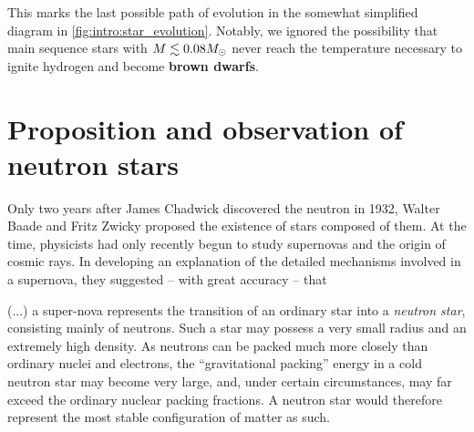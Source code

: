 This marks the last possible path of evolution in the somewhat simplified diagram in \cref{fig:intro:star_evolution}.
Notably, we ignored the possibility that main sequence stars with $M \lesssim 0.08 M_\odot$ never reach the temperature necessary to ignite hydrogen and become \textbf{brown dwarfs}.

\section{Proposition and observation of neutron stars}

Only two years after James Chadwick discovered the neutron in 1932, \cite{ref:neutron_discovery}
Walter Baade and Fritz Zwicky proposed the existence of stars composed of them.
At the time, physicists had only recently begun to study supernovas and the origin of cosmic rays.
In developing an explanation of the detailed mechanisms involved in a supernova, they suggested -- with great accuracy -- that
\cite[page 263]{ref:supernova_cosmic_rays_neutron_stars}
\begin{displayquote}
(...) %
a super-nova represents the transition of an ordinary star into a \emph{neutron star}, consisting mainly of neutrons.
Such a star may possess a very small radius and an extremely high density.
As neutrons can be packed much more closely than ordinary nuclei and electrons, the ``gravitational packing'' energy in a cold neutron star may become very large, and, under certain circumstances, may far exceed the ordinary nuclear packing fractions.
A neutron star would therefore represent the most stable configuration of matter as such.
\end{displayquote}

\iffalse
The first theoretical model of a neutron star was developed by Oppenheimer and Volkoff in 1939. \cite{ref:tov}
Assuming a neutron star consists entirely of a non-interacting cold Fermi gas, they found an equation of state governing its internals and solved the Einstein field equations in a radially symmetric perfect fluid to find the mass and radii of neutron stars.
In such a cold gas, thermal motion contributes nothing to the pressure, so any pressure is only due to the Pauli exclusion principle, stating that no fermions can be in the same quantum state.
Analogously to the Chandrasekhar limit, their results implied that this degeneracy pressure could only support masses up to $M < 0.7 \solarmass$.
\fi

